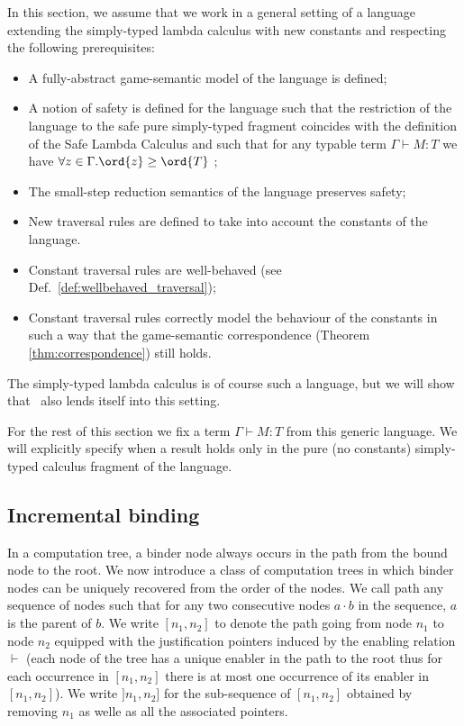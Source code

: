 In this section, we assume that we work in a general setting of a
language extending the simply-typed lambda calculus with new
constants and respecting the following prerequisites:
\begin{itemize}
\item A fully-abstract game-semantic model of the language is
defined;
\item A notion of safety is defined for the language such that the
restriction of the language to the safe pure simply-typed
fragment coincides with the definition of the Safe Lambda
Calculus and such that for any typable term $\Gamma \vdash M :
T$ we have $\forall z \in \Gamma . \ord{z} \geq \ord{T}$ ;
\item The small-step reduction semantics of the language preserves safety;
\item New traversal rules are defined to take into account the constants of the language.
\item Constant traversal rules are well-behaved (see Def.\
\ref{def:wellbehaved_traversal});
\item Constant traversal rules correctly model the behaviour of the constants in such a way
that the game-semantic correspondence (Theorem
\ref{thm:correspondence}) still holds.
\end{itemize}

The simply-typed lambda calculus is of course such a language, but
we will show that \pcf\ also lends itself into this setting.

For the rest of this section we fix a term $\Gamma \vdash M : T$
from this generic language. We will explicitly specify when a result
holds only in the pure (\ie no constants) simply-typed calculus
fragment of the language.

\subsection{Incremental binding}

In a computation tree, a binder node always occurs in the path from
the bound node to the root. We now introduce a class of computation
trees in which binder nodes can be uniquely recovered from the order
of the nodes. We call path any sequence of nodes such that for any
two consecutive nodes $a \cdot b$ in the sequence, $a$ is the parent
of $b$. We write $[n_1,n_2]$ to denote the path going from node
$n_1$ to node $n_2$ equipped with the justification pointers induced
by the enabling relation $\vdash$ (each node of the tree has a
unique enabler in the path to the root thus for each occurrence in
$[n_1,n_2]$ there is at most one occurrence of its enabler in
$[n_1,n_2]$). We write $]n_1,n_2]$ for the sub-sequence of
$[n_1,n_2]$ obtained by removing $n_1$ as welle as all the
associated pointers.

